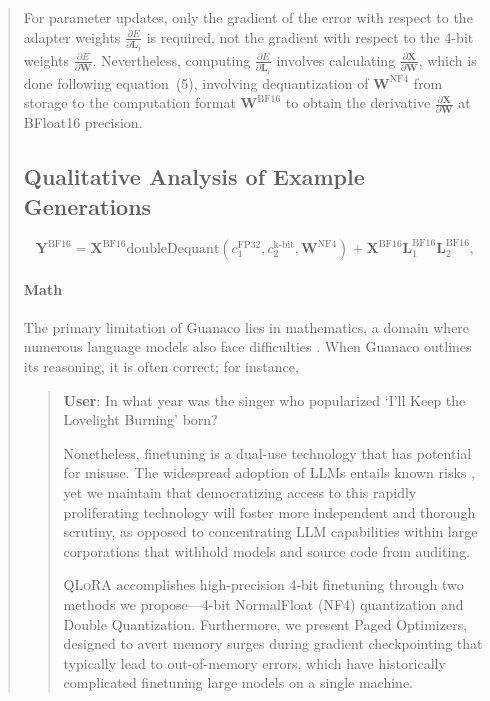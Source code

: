 \begin{quote}
For parameter updates, only the gradient of the error with respect to the adapter weights $\frac{\partial E}{\partial \mathbf{L}_i}$ is required, not the gradient with respect to the 4-bit weights $\frac{\partial E}{\partial \mathbf{W}}$. Nevertheless, computing $\frac{\partial E}{\partial \mathbf{L}_i}$ involves calculating $\frac{\partial \mathbf{X}}{\partial \mathbf{W}}$, which is done following equation~(5), involving dequantization of $\mathbf{W}^{\text{NF4}}$ from storage to the computation format $\mathbf{W}^{\text{BF16}}$ to obtain the derivative $\frac{\partial \mathbf{X}}{\partial \mathbf{W}}$ at BFloat16 precision.

\subsection{Qualitative Analysis of Example Generations}
\label{ssec:examples}

\begin{equation}
    \mathbf{Y}^{\text{BF16}} =  \mathbf{X}^{\text{BF16}} \text{doubleDequant}(c_1^{\text{FP32}}, c_2^{\text{k-bit}}, \mathbf{W}^{\text{NF4}}) + \mathbf{X}^{\text{BF16}}\mathbf{L}^{\text{BF16}}_1\mathbf{L}^{\text{BF16}}_2,
\end{equation}

\paragraph{Math} The primary limitation of {Guanaco} lies in mathematics, a domain where numerous language models also face difficulties \citep{liang2022holistic}. When {Guanaco} outlines its reasoning, it is often correct; for instance,

\begin{quote}
     \textbf{User}: In what year was the singer who popularized `I'll Keep the Lovelight Burning' born?  

Nonetheless, finetuning is a dual-use technology that has potential for misuse. The widespread adoption of LLMs entails known risks \citep{bommasani2021opportunities,bender2021dangers}, yet we maintain that democratizing access to this rapidly proliferating technology will foster more independent and thorough scrutiny, as opposed to concentrating LLM capabilities within large corporations that withhold models and source code from auditing.

\textsc{QLoRA} accomplishes high-precision 4-bit finetuning through two methods we propose—4-bit NormalFloat (NF4) quantization and Double Quantization. Furthermore, we present Paged Optimizers, designed to avert memory surges during gradient checkpointing that typically lead to out-of-memory errors, which have historically complicated finetuning large models on a single machine.


\end{quote}
\end{quote}

